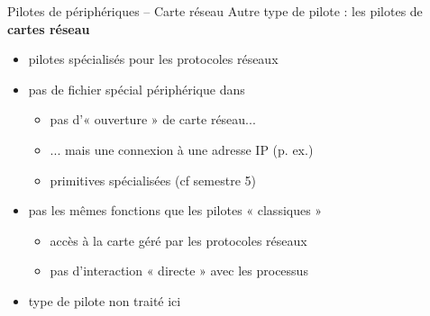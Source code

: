 \begin {frame} {Pilotes de périphériques -- Carte réseau}
    Autre type de pilote : les pilotes de \textbf {cartes réseau}

    \begin {itemize}
	\item pilotes spécialisés pour les protocoles réseaux
	\item pas de fichier spécial périphérique dans 
	    \begin {itemize}
		\item pas d'« ouverture » de carte réseau...
		\item ... mais une connexion à une adresse IP (p. ex.)
		\item \implique primitives spécialisées (cf semestre 5)
	    \end {itemize}
	\item pas les mêmes fonctions que les pilotes « classiques »
	    \begin {itemize}
		\item accès à la carte géré par les protocoles réseaux
		\item pas d'interaction « directe » avec les processus
	    \end {itemize}
	\item type de pilote non traité ici
    \end {itemize}
\end {frame}

